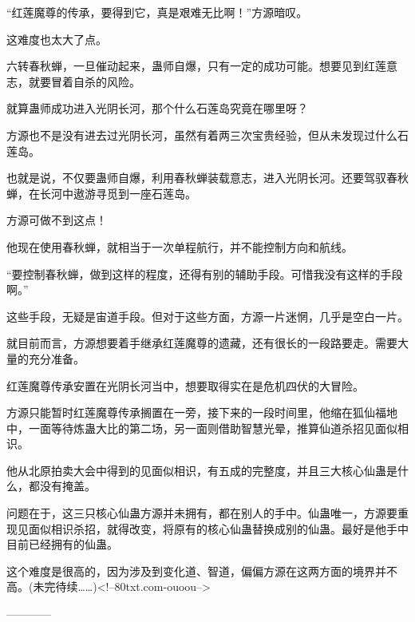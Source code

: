 \begin{this_body}
“红莲魔尊的传承，要得到它，真是艰难无比啊！”方源暗叹。

这难度也太大了点。

六转春秋蝉，一旦催动起来，蛊师自爆，只有一定的成功可能。想要见到红莲意志，就要冒着自杀的风险。

就算蛊师成功进入光阴长河，那个什么石莲岛究竟在哪里呀？

方源也不是没有进去过光阴长河，虽然有着两三次宝贵经验，但从未发现过什么石莲岛。

也就是说，不仅要蛊师自爆，利用春秋蝉装载意志，进入光阴长河。还要驾驭春秋蝉，在长河中遨游寻觅到一座石莲岛。

方源可做不到这点！

他现在使用春秋蝉，就相当于一次单程航行，并不能控制方向和航线。

“要控制春秋蝉，做到这样的程度，还得有别的辅助手段。可惜我没有这样的手段啊。”

这些手段，无疑是宙道手段。但对于这些方面，方源一片迷惘，几乎是空白一片。

就目前而言，方源想要着手继承红莲魔尊的遗藏，还有很长的一段路要走。需要大量的充分准备。

红莲魔尊传承安置在光阴长河当中，想要取得实在是危机四伏的大冒险。

方源只能暂时红莲魔尊传承搁置在一旁，接下来的一段时间里，他缩在狐仙福地中，一面等待炼蛊大比的第二场，另一面则借助智慧光晕，推算仙道杀招见面似相识。

他从北原拍卖大会中得到的见面似相识，有五成的完整度，并且三大核心仙蛊是什么，都没有掩盖。

问题在于，这三只核心仙蛊方源并未拥有，都在别人的手中。仙蛊唯一，方源要重现见面似相识杀招，就得改变，将原有的核心仙蛊替换成别的仙蛊。最好是他手中目前已经拥有的仙蛊。

这个难度是很高的，因为涉及到变化道、智道，偏偏方源在这两方面的境界并不高。(未完待续……)<!--80txt.com-ouoou-->

------------

\end{this_body}

